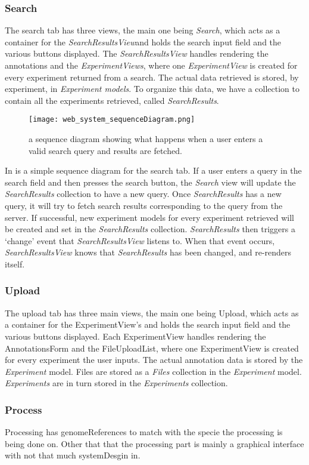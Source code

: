 \subsubsection{Search}
The search tab has three views, the main one being \textit{Search}, which acts as a container for the \textit{SearchResultsView}and holds the search input field and the various buttons displayed. The \textit{SearchResultsView} handles rendering the annotations and the \textit{ExperimentViews}, where one \textit{ExperimentView} is created for every experiment returned from a search. The actual data retrieved is stored, by experiment, in \textit{Experiment models}. To organize this data, we have a collection to contain all the experiments retrieved, called \textit{SearchResults}.
 
\begin{figure}[h]
\centering
\texttt{[image: web\_system\_sequenceDiagram.png]}
\caption{\label{fig:web_system_sequenceDiagram}a sequence diagram showing what happens when a user enters a valid search query and results are fetched.}
\end{figure}

In  is a simple sequence diagram for the search tab. If a user enters a query in the search field and then presses the search button, the \textit{Search} view will update the \textit{SearchResults} collection to have a new query. Once \textit{SearchResults} has a new query, it will try to fetch search results corresponding to the query from the server. If successful, new experiment models for every experiment retrieved will be created and set in the \textit{SearchResults} collection. \textit{SearchResults} then triggers a ‘change’ event that \textit{SearchResultsView} listens to. When that event occurs, \textit{SearchResultsView} knows that \textit{SearchResults} has been changed, and re-renders itself.


\subsubsection{Upload}
The upload tab has three main views, the main one being Upload, which acts as a container for the ExperimentView’s and holds the search input field and the various buttons displayed. Each ExperimentView handles rendering the AnnotationsForm and the FileUploadList, where one ExperimentView is created for every experiment the user inputs. The actual annotation data is stored by the \textit{Experiment} model. Files are stored as a \textit{Files} collection in the \textit{Experiment} model. \textit{Experiments} are in turn stored in the \textit{Experiments} collection.
\subsubsection{Process}
Processing has genomeReferences to match with the specie the processing is being done on. Other that that the processing part is mainly a graphical interface with not that much systemDesgin in.
